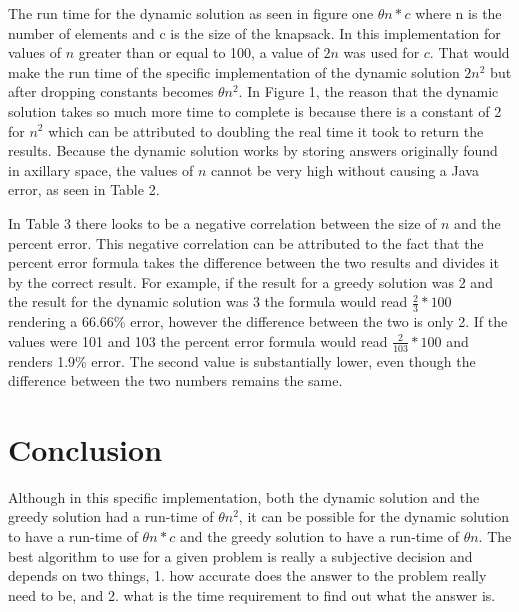 \documentclass[onecolumn, 12pt, article]{IEEEtran}
\numberwithin{case}{problem}
\numberwithin{condition}{problem}
\numberwithin{condition}{subsection}
\numberwithin{definition}{section}
\theoremstyle{remark}
\numberwithin{question}{problem}
\theoremstyle{plain}
\numberwithin{answer}{problem}
\numberwithin{solution}{section}
\numberwithin{equation}{section}%
\begin{document}
The run time for the dynamic solution as seen in figure one $ \theta{n*c} $ where n is the number of elements and c is the size of the knapsack. In this implementation for values of $n$ greater than or equal to 100, a value of $2n$ was used for $c$. That would make the run time of the specific implementation of the dynamic solution $2n^2$ but after dropping constants becomes $ \theta{n^2} $. In Figure 1, the reason that the dynamic solution takes so much more time to complete is because there is a constant of 2 for $n^2$ which can be attributed to doubling the real time it took to return the results. Because the dynamic solution works by storing answers originally found in axillary space, the values of $n$ cannot be very high without causing a Java error, as seen in Table 2. 

In Table 3 there looks to be a negative correlation between the size of $n$ and the percent error. This negative correlation can be attributed to the fact that the percent error formula takes the difference between the two results and divides it by the correct result. For example, if the result for a greedy solution was 2 and the result for the dynamic solution was 3 the formula would read $ \frac{2}{3} * 100 $ rendering a 66.66\% error, however the difference between the two is only 2. If the values were 101 and 103 the percent error formula would read $ \frac{2}{103} * 100 $ and renders 1.9\% error. The second value is substantially lower, even though the difference between the two numbers remains the same.


\section{Conclusion}
Although in this specific implementation, both the dynamic solution and the greedy solution had a run-time of $\theta{n^2}$, it can be possible for the dynamic solution to have a run-time of $\theta{n*c}$ and the greedy solution to have a run-time of $\theta{n}$. The best algorithm to use for a given problem is really a subjective decision and depends on two things, 1. how accurate does the answer to the problem really need to be, and 2. what is the time requirement to find out what the answer is. 


\newpage

\end{document}
